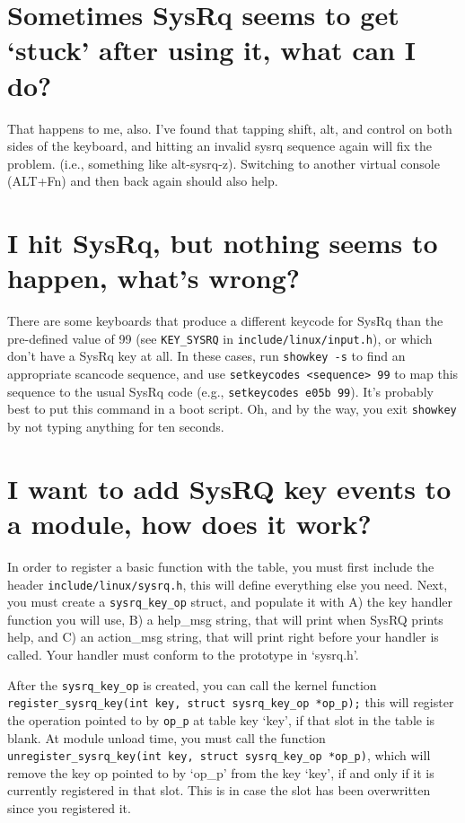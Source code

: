 \documentclass[article,letterpaper]{memoir}
\let\subsection\section
\let\section\chapter
\begin{document}
\iffalse
\subsection{\texorpdfstring{Sometimes SysRq seems to get `stuck' after
using it, what can I
do?}{Sometimes SysRq seems to get stuck after using it, what can I do?}}\label{sometimes-sysrq-seems-to-get-stuck-after-using-it-what-can-i-do}

That happens to me, also. I've found that tapping shift, alt, and
control on both sides of the keyboard, and hitting an invalid sysrq
sequence again will fix the problem. (i.e., something like alt-sysrq-z).
Switching to another virtual console (ALT+Fn) and then back again should
also help.

\subsection{I hit SysRq, but nothing seems to happen, what's
wrong?}\label{i-hit-sysrq-but-nothing-seems-to-happen-whats-wrong}

There are some keyboards that produce a different keycode for SysRq than
the pre-defined value of 99 (see \texttt{KEY\_SYSRQ} in
\texttt{include/linux/input.h}), or which don't have a SysRq key at all.
In these cases, run \texttt{showkey\ -s} to find an appropriate scancode
sequence, and use
\texttt{setkeycodes\ \textless{}sequence\textgreater{}\ 99} to map this
sequence to the usual SysRq code (e.g., \texttt{setkeycodes\ e05b\ 99}).
It's probably best to put this command in a boot script. Oh, and by the
way, you exit \texttt{showkey} by not typing anything for ten seconds.

\subsection{I want to add SysRQ key events to a module, how does it
work?}\label{i-want-to-add-sysrq-key-events-to-a-module-how-does-it-work}

In order to register a basic function with the table, you must first
include the header \texttt{include/linux/sysrq.h}, this will define
everything else you need. Next, you must create a
\texttt{sysrq\_key\_op} struct, and populate it with A) the key handler
function you will use, B) a help\_msg string, that will print when SysRQ
prints help, and C) an action\_msg string, that will print right before
your handler is called. Your handler must conform to the prototype in
`sysrq.h'.

After the \texttt{sysrq\_key\_op} is created, you can call the kernel
function
\texttt{register\_sysrq\_key(int\ key,\ struct\ sysrq\_key\_op\ *op\_p);}
this will register the operation pointed to by \texttt{op\_p} at table
key `key', if that slot in the table is blank. At module unload time,
you must call the function
\texttt{unregister\_sysrq\_key(int\ key,\ struct\ sysrq\_key\_op\ *op\_p)},
which will remove the key op pointed to by `op\_p' from the key `key',
if and only if it is currently registered in that slot. This is in case
the slot has been overwritten since you registered it.
\end{document}

